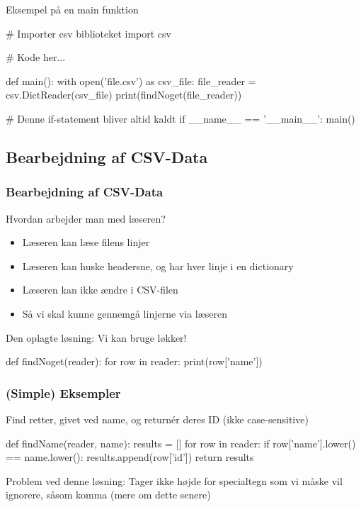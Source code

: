 \documentclass[aspectratio=169,12pt,t]{beamer}
\begin{document}
\begin{frame}[fragile]
  \vspace*{-9pt}
  \begin{block}{Eksempel på en main funktion}
    \begin{python}
# Importer csv biblioteket
import csv

# Kode her...

def main():
    with open('file.csv') as csv_file:
       file_reader = csv.DictReader(csv_file)
       print(findNoget(file_reader))

# Denne if-statement bliver altid kaldt
if __name__ == '__main__':
    main()
    \end{python}
  \end{block}
\end{frame}

\subsection{Bearbejdning af CSV-Data}
\begin{frame}[fragile]
  \frametitle{Bearbejdning af CSV-Data}
  \vspace*{-12pt}
  \begin{block}{Hvordan arbejder man med læseren?}
    \begin{itemize}
      \item Læseren kan læse filens linjer
      \item Læseren kan huske headersne, og har hver linje i en dictionary
      \item Læseren kan ikke ændre i CSV-filen
      \item Så vi skal kunne gennemgå linjerne via læseren
    \end{itemize}
  \end{block}

  \begin{block}{Den oplagte løsning:}
    Vi kan bruge løkker!
    \begin{python}
def findNoget(reader):
    for row in reader:
        print(row['name'])
    \end{python}
  \end{block}
\end{frame}

\begin{frame}[fragile]
  \frametitle{(Simple) Eksempler}
  \vspace*{-14pt}
\begin{block}{Find retter, givet ved name, og returnér deres ID
              (ikke case-sensitive)}
\begin{python}
def findName(reader, name):
    results = []
    for row in reader:
        if row['name'].lower() == name.lower():
            results.append(row['id'])
    return results
\end{python}
\end{block}
\begin{block}{Problem ved denne løsning:}
Tager ikke højde for specialtegn som vi måske vil ignorere, såsom komma 
      (mere om dette senere)
\end{block}
\end{frame}
\end{document}
